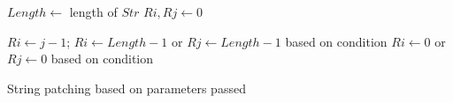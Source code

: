 \begin{algorithm}
\small
\DontPrintSemicolon
{}
\Begin
{
	$Length \longleftarrow$ length of $Str$\;
	{
		$Ri, Rj \longleftarrow 0$\;
	}
	\Else
	{
		{
			$Ri \longleftarrow j - 1$;
		}
		{
			$Ri \longleftarrow Length - 1$ or $Rj \longleftarrow Length - 1$ based on
			condition\; 
		}
		{
			$Ri \longleftarrow 0$ or $Rj \longleftarrow 0$ based on
			condition\; 
		}
		
		
	}	

}
\caption{String patching based on parameters passed}
\label{algo:stringPatchParametr}
\end{algorithm}